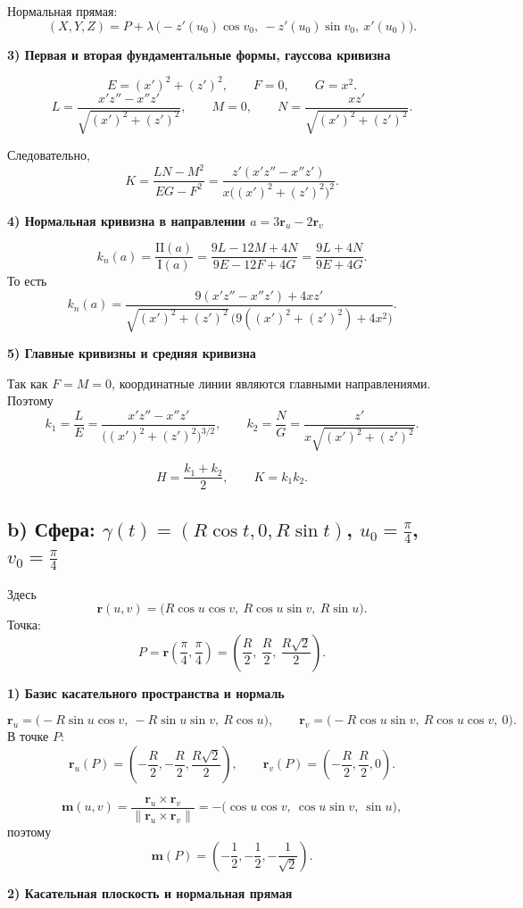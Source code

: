 \documentclass[12pt,a4paper]{article}
\begin{document}
Нормальная прямая:
\[
(X,Y,Z)=P+\lambda\,\bigl(-z'(u_0)\cos v_0,\ -z'(u_0)\sin v_0,\ x'(u_0)\bigr).
\]

\textbf{3) Первая и вторая фундаментальные формы, гауссова кривизна}

\[
E=(x')^2+(z')^2,\qquad F=0,\qquad G=x^2.
\]
\[
L=\frac{x'z''-x''z'}{\sqrt{(x')^2+(z')^2}},\qquad M=0,\qquad
N=\frac{xz'}{\sqrt{(x')^2+(z')^2}}.
\]

Следовательно,
\[
K=\frac{LN-M^2}{EG-F^2}
=\frac{z'(x'z''-x''z')}{x\bigl((x')^2+(z')^2\bigr)^2}.
\]

\textbf{4) Нормальная кривизна в направлении $a=3\mathbf r_u-2\mathbf r_v$}

\[
k_n(a)=\frac{\mathrm{II}(a)}{\mathrm{I}(a)}
=\frac{9L-12M+4N}{9E-12F+4G}
=\frac{9L+4N}{9E+4G}.
\]
То есть
\[
k_n(a)=
\frac{9(x'z''-x''z')+4xz'}{\sqrt{(x')^2+(z')^2}\,\bigl(9((x')^2+(z')^2)+4x^2\bigr)}.
\]

\textbf{5) Главные кривизны и средняя кривизна}

Так как $F=M=0$, координатные линии являются главными направлениями. Поэтому
\[
k_1=\frac{L}{E}=\frac{x'z''-x''z'}{\bigl((x')^2+(z')^2\bigr)^{3/2}},\qquad
k_2=\frac{N}{G}=\frac{z'}{x\sqrt{(x')^2+(z')^2}}.
\]

\[
H=\frac{k_1+k_2}{2},\qquad K=k_1k_2.
\]

\subsection*{b) Сфера: $\gamma(t) = (R\cos t, 0, R\sin t)$, $u_0=\frac{\pi}{4}$, $v_0=\frac{\pi}{4}$}

Здесь
\[
\mathbf r(u,v)=\bigl(R\cos u\cos v,\ R\cos u\sin v,\ R\sin u\bigr).
\]
Точка:
\[
P=\mathbf r\!\left(\frac{\pi}{4},\frac{\pi}{4}\right)=
\left(\frac R2,\ \frac R2,\ \frac{R\sqrt2}{2}\right).
\]

\textbf{1) Базис касательного пространства и нормаль}

\[
\mathbf r_u=\bigl(-R\sin u\cos v,\ -R\sin u\sin v,\ R\cos u\bigr),\qquad
\mathbf r_v=\bigl(-R\cos u\sin v,\ R\cos u\cos v,\ 0\bigr).
\]
В точке $P$:
\[
\mathbf r_u(P)=\left(-\frac R2,-\frac R2,\frac{R\sqrt2}{2}\right),\qquad
\mathbf r_v(P)=\left(-\frac R2,\frac R2,0\right).
\]

\[
\mathbf m(u,v)=\frac{\mathbf r_u\times \mathbf r_v}{\|\mathbf r_u\times \mathbf r_v\|}
=-\bigl(\cos u\cos v,\ \cos u\sin v,\ \sin u\bigr),
\]
поэтому
\[
\mathbf m(P)=\left(-\frac12,-\frac12,-\frac1{\sqrt2}\right).
\]

\textbf{2) Касательная плоскость и нормальная прямая}
\end{document}
